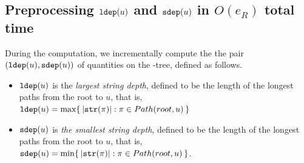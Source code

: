 \documentclass{article}
\begin{document}



\subsection{Preprocessing $\mathtt{ldep}(u)$ and $\mathtt{sdep}(u)$ in $O(e_R)$ total time}
\label{sec:compute:cdawg:preprocess}

During the computation, we incrementally compute the the pair $(\mathtt{ldep}(u), \mathtt{sdep}(u))$ of quantities on the \LPTrm-tree, defined as follows. 
\begin{itemize}
\item $\mathtt{ldep}(u)$ is the \textit{largest string depth}, defined to be the length of the longest paths from the root to $u$,
that is, $\mathtt{ldep}(u) = \max \{\kern0.2em |\mathtt{str}(\pi)| : \pi \in Path(root, u) \kern0.2em\}$

\item $\mathtt{sdep}(u)$ is \textit{the smallest string depth}, defined to be the length of the longest paths from the root to $u$, that is, $\mathtt{sdep}(u) = \min \{\kern0.2em |\mathtt{str}(\pi)| : \pi \in Path(root, u) \kern0.2em\}$. 
\end{itemize}
\end{document}
